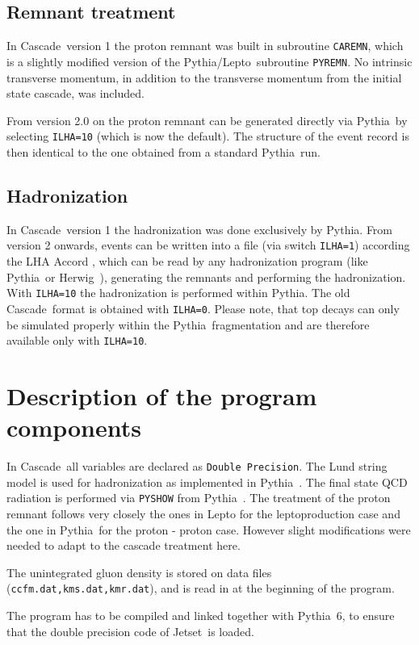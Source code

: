 \documentclass[11pt]{article} \usepackage{mystyle-new}
\newcommand{\LEPTOMC}{Ingelman_LEPTO65}
\newcommand{\PYTHIAMC}{Pythia61}
\def\CASCADE{{\sc Cascade}}
\def\LEPTO{{\sc Lepto}}
\def\PYTHIA{{\sc Pythia}}
\def\HERWIG{{\sc Herwig}}
\def\JETSET{{\sc Jetset}}
\begin{document}
\subsection{Remnant treatment}

In \CASCADE\ version 1 the proton remnant was built in subroutine \verb+CAREMN+, which is a slightly
modified version of the \PYTHIA /\LEPTO\ subroutine \verb+PYREMN+. No intrinsic transverse momentum, in addition  to the transverse
momentum from the initial state cascade, was included.

From version 2.0 on the proton remnant can be generated directly via \PYTHIA\,
by selecting \verb+ILHA=10+ (which is now the default). 
The structure of the event record is then identical
to the one obtained from a standard \PYTHIA\ run. 

\subsection{Hadronization}

In \CASCADE\ version 1 the hadronization was done exclusively by \PYTHIA .  From version 2 onwards, events can be written into a file (via
switch \verb+ILHA=1+) according the LHA Accord \cite{lhaaccord},
which can be read by  any hadronization
program (like \PYTHIA\ or \HERWIG\ ), generating the remnants and performing the
hadronization.  With \verb+ILHA=10+   the hadronization is performed
within \PYTHIA .
The old \CASCADE\ format is obtained with \verb+ILHA=0+. Please note, that top decays can only be simulated properly within the \PYTHIA\ fragmentation and are therefore available only with  \verb+ILHA=10+.

\section{Description of the program components}
In \CASCADE\ all variables are declared as \verb"Double Precision". The 
Lund string model is used for hadronization as implemented in \PYTHIA\  
\cite{\PYTHIAMC}. The final state QCD radiation is performed via 
\verb"PYSHOW" from
 \PYTHIA\ . 
 The treatment of the proton remnant follows very closely the ones in
 \LEPTO \cite{\LEPTOMC} for the leptoproduction case and the one in 
\PYTHIA\  for the proton - proton case. However slight modifications were needed
to adapt to the cascade treatment here.
\par
The unintegrated gluon density is stored on data files
(\verb+ccfm.dat,kms.dat,kmr.dat+), 
and is read in at the beginning of the program.
\par
The program has to be compiled and linked together with \PYTHIA\ 6, to ensure that the double
precision code of \JETSET\  is loaded.
\end{document}
